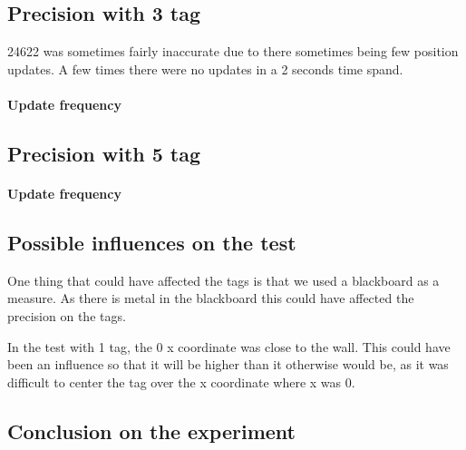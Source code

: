 \subsection{Precision with 3 tag}

24622 was sometimes fairly inaccurate due to there sometimes being few position updates. 
A few times there were no updates in a 2 seconds time spand.    

\paragraph{Update frequency}

\subsection{Precision with 5 tag}

\paragraph{Update frequency}

\subsection{Possible influences on the test}
One thing that could have affected the tags is that we used a blackboard as a measure. 
As there is metal in the blackboard this could have affected the precision on the tags.

In the test with 1 tag, the 0 x coordinate was close to the wall. 
This could have been an influence so that it will be higher than it otherwise would be, as it was difficult to center the tag over the x coordinate where x was 0.

\subsection{Conclusion on the experiment}